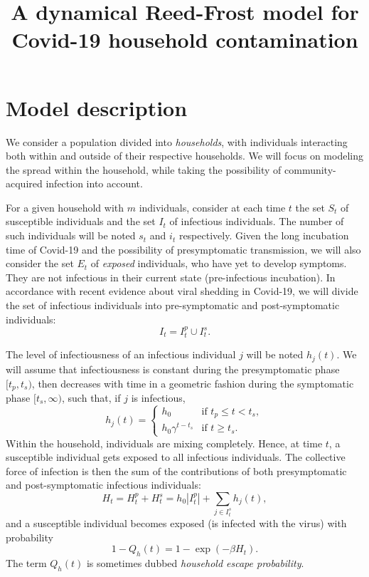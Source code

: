 \documentclass[a4paper]{article}
\title{A dynamical Reed-Frost model for Covid-19 household contamination}
\begin{document}
\maketitle

\section*{Model description}

We consider a population divided into \emph{households}, with individuals
interacting both within and outside of their respective households. We will 
focus on modeling the spread within the household, while taking the possibility
of community-acquired infection into account. 

For a given household with \(m\) individuals, consider at each time \(t\) the
set \(S_t\) of susceptible individuals and the set \(I_t\) of infectious
individuals. The number of such individuals will be noted \(s_t\) and \(i_t\)
respectively. Given the long incubation time of Covid-19 and the possibility of
presymptomatic transmission, we will also consider the set \(E_t\) of 
\emph{exposed} individuals, who have yet to develop symptoms. They are not
infectious in their current state (pre-infectious incubation). In accordance 
with recent evidence about viral shedding in Covid-19, we will divide the set of
infectious individuals into pre-symptomatic and post-symptomatic individuals: 
\[
	I_t=I_t^p\cup I_t^s.
\]

The level of infectiousness of an infectious individual \(j\) will be noted 
\(h_j(t)\). We will assume that infectiousness is constant during the
presymptomatic phase \([t_p,t_s)\), then decreases with time in a geometric
fashion during the symptomatic phase \([t_s,\infty)\), such
that, if \(j\) is infectious, \begin{equation}
	h_j(t)  = 
		\begin{cases}
		h_0 & \text{if } t_p \le t < t_s,\\ 
		h_0\gamma^{t-t_s}& \text{if } t\ge t_s.
		\end{cases} 
\end{equation}
Within the household, individuals are mixing completely. Hence, at time \(t\), a
susceptible individual gets exposed to all infectious individuals. The 
collective force of infection is then the sum of the contributions of both
presymptomatic and post-symptomatic infectious individuals:
\begin{equation}
	H_t = H_t^p + H_t^s = h_0 |I^p_t| + \sum_{j\in I_t^s} h_j(t),
\end{equation}
and a susceptible individual becomes exposed (is infected with the virus) with
probability
\begin{equation}
	1-Q_h(t) = 1- \exp(-\beta H_t).
\end{equation}
The term \(Q_h(t)\) is sometimes dubbed \emph{household escape probability}. 
\end{document}
